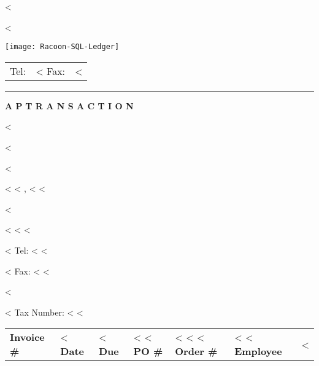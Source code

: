 \documentclass{scrartcl}
\begin{document}
\pagestyle{empty}

\fontsize{10pt}{12pt}\selectfont

\parbox{\textwidth}{%
  \parbox[b]{.42\textwidth}{%
    <%
   
    <%
  }
  \parbox[b]{.2\textwidth}{
    \texttt{[image: Racoon-SQL-Ledger]}
  }\hfill
  \begin{tabular}[b]{rr@{}}
  Tel: & <%
  Fax: & <%
  \end{tabular}

  \rule[1.5em]{\textwidth}{0.5pt}
}

\centerline{\textbf{A P} \hspace{0.3cm} \textbf{T R A N S A C T I O N}}

\vspace*{0.5cm}

\parbox[t]{.5\textwidth}{
<%

<%

<%

<%
<%
, <%
<%

<%

\vspace{0.3cm}

<%
<%
<%

\vspace{0.2cm}

<%
Tel: <%
<%

<%
Fax: <%
<%

<%

<%
Tax Number: <%
<%
}
\hfill
\begin{tabular}[t]{ll}
  \textbf{Invoice \#} & <%
  \textbf{Date} & <%
  \textbf{Due} & <%
  <%
    \textbf{PO \#} & <%
  <%
  <%
    \textbf{Order \#} & <%
  <%
  \textbf{Employee} & <%
\end{tabular}

\vspace{1cm}
\end{document}

